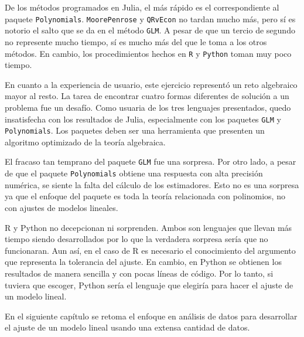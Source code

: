 De los métodos programados en \textsf{Julia}, el más rápido es el correspondiente al paquete \texttt{Polynomials}. \texttt{MoorePenrose} y \texttt{QRvEcon} no tardan mucho más, pero sí es notorio el salto que se da en el método \texttt{GLM}. A pesar de que un tercio de segundo no represente mucho tiempo, sí es mucho más del que le toma a los otros métodos. En cambio, los procedimientos hechos en \texttt{R} y \texttt{Python} toman muy poco tiempo. 

En cuanto a la experiencia de usuario, este ejercicio representó un reto algebraico mayor al resto. La tarea de encontrar cuatro formas diferentes de solución a un problema fue un desafío. Como usuaria de los tres lenguajes presentados, quedo insatisfecha con los resultados de \textsf{Julia}, especialmente con los paquetes \texttt{GLM} y \texttt{Polynomials}. Los paquetes deben ser una herramienta que presenten un algoritmo optimizado de la teoría algebraica. 

El fracaso tan temprano del paquete \texttt{GLM} fue una sorpresa. Por otro lado, a pesar de que el paquete \texttt{Polynomials} obtiene una respuesta con alta precisión numérica, se siente la falta del cálculo de los estimadores. Esto no es una sorpresa ya que el enfoque del paquete es toda la teoría relacionada con polinomios, no con ajustes de modelos lineales. 

\textsf{R} y \textsf{Python} no decepcionan ni sorprenden. Ambos son lenguajes que llevan más tiempo siendo desarrollados por lo que la verdadera sorpresa sería que no funcionaran. Aun así, en el caso de \textsf{R} es necesario el conocimiento del argumento que representa la tolerancia del ajuste. En cambio, en \textsf{Python} se obtienen los resultados de manera sencilla y con pocas líneas de código. Por lo tanto, si tuviera que escoger, \textsf{Python} sería el lenguaje que elegiría para hacer el ajuste de un modelo lineal. 

En el siguiente capítulo se retoma el enfoque en análisis de datos para desarrollar el ajuste de un modelo lineal usando una extensa cantidad de datos. 

